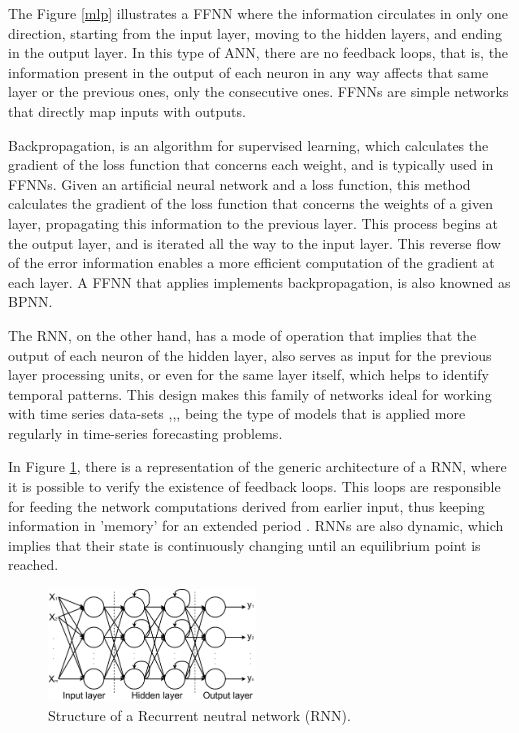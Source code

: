 The Figure \ref{mlp} illustrates a \ac{FFNN} where the information circulates in only one direction, starting from the input layer, moving to the hidden layers, and ending in the output layer. In this type of \acs{ANN}, there are no feedback loops, that is, the information present in the output of each neuron in any way affects that same layer or the previous ones, only the consecutive ones. \ac{FFNN}s are simple networks that directly map inputs with outputs.

Backpropagation, is an algorithm for supervised learning, which calculates the gradient of the loss function that concerns each weight, and is typically used in \ac{FFNN}s. Given an artificial neural network and a loss function, this method calculates the gradient of the loss function that concerns the weights of a given layer, propagating this information to the previous layer. This process begins at the output layer, and is iterated all the way to the input layer. This reverse flow of the error information enables a more efficient computation of the gradient at each layer. A \ac{FFNN} that applies implements backpropagation, is also knowned as \ac{BPNN}.


The \ac{RNN}, on the other hand, has a mode of operation that implies that the output of each neuron of the hidden layer, also serves as input for the previous layer processing units, or even for the same layer itself, which helps to identify temporal patterns. This design makes this family of networks ideal for working with time series data-sets \cite{rnn1},\cite{rnn2},\cite{rnn3}, being the type of models that is applied more regularly in time-series forecasting problems.

In Figure \ref{rnn}, there is a representation of the generic architecture of a \ac{RNN}, where it is possible to verify the existence of feedback loops. This loops are responsible for feeding the network computations derived from earlier input, thus keeping information in 'memory' for an extended period \cite{rnn4}. \ac{RNN}s are also dynamic, which implies that their state is continuously changing until an equilibrium point is reached. 

\begin{figure}[h!]
    \centering
    \begin{center}
    \includegraphics[width=0.49\textwidth]{Images/rnn.png}
    \caption{Structure of a Recurrent neutral network (RNN).}
    \label{rnn}
    \end{center}
\end{figure}




